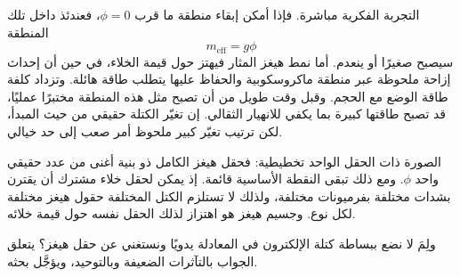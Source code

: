 \begin{classroomqa}
\end{classroomqa}

التجربة الفكرية مباشرة. فإذا أمكن إبقاء منطقة ما قرب \(\phi=0\)، فعندئذ داخل تلك المنطقة
\begin{equation}
m_{\mathrm{eff}}=g\phi
\end{equation}
سيصبح صغيرًا أو ينعدم. أما نمط هيغز المثار فيهتز حول قيمة الخلاء، في حين أن إحداث إزاحة ملحوظة عبر منطقة ماكروسكوبية والحفاظ عليها يتطلب طاقة هائلة. وتزداد كلفة طاقة الوضع مع الحجم. وقبل وقت طويل من أن تصبح مثل هذه المنطقة مختبرًا عمليًا، قد تصبح طاقتها كبيرة بما يكفي للانهيار الثقالي. إن تغيّر الكتلة حقيقي من حيث المبدأ، لكن ترتيب تغيّر كبير ملحوظ أمر صعب إلى حد خيالي.

\begin{classroomqa}
\end{classroomqa}

\begin{classroomqa}
\end{classroomqa}

الصورة ذات الحقل الواحد تخطيطية: فحقل هيغز الكامل ذو بنية أغنى من عدد حقيقي واحد \(\phi\). ومع ذلك تبقى النقطة الأساسية قائمة. إذ يمكن لحقل خلاء مشترك أن يقترن بشدات مختلفة بفرميونات مختلفة، ولذلك لا تستلزم الكتل المختلفة حقول هيغز مختلفة لكل نوع. وجسيم هيغز هو اهتزاز لذلك الحقل نفسه حول قيمة خلائه.

ولِمَ لا نضع ببساطة كتلة الإلكترون في المعادلة يدويًا ونستغني عن حقل هيغز؟ يتعلق الجواب بالتآثرات الضعيفة وبالتوحيد، ويؤجَّل بحثه.

\begin{classroomqa}
\end{classroomqa}

